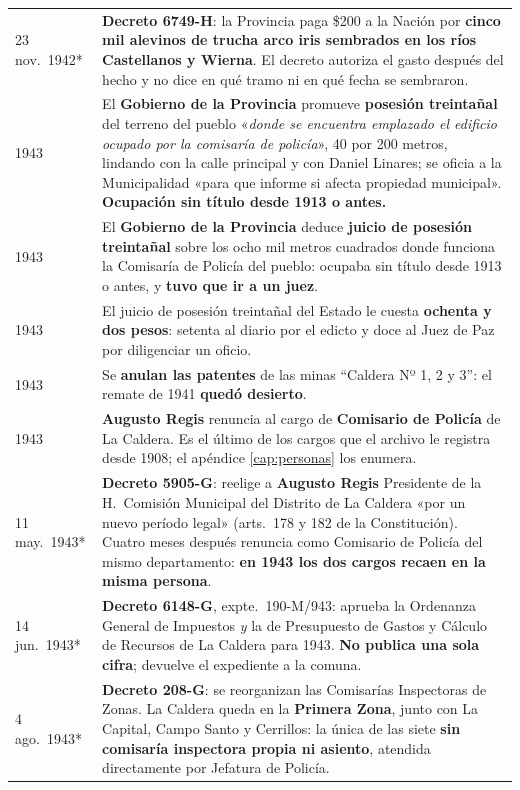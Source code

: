 \begin{longtable}{@{}p{2.7cm}p{10.3cm}@{}}
23 nov.\ 1942* & \textbf{Decreto 6749-H}: la Provincia paga \$200 a la Nación por \textbf{cinco mil alevinos de trucha arco iris sembrados en los ríos Castellanos y Wierna}. El decreto autoriza el gasto después del hecho y no dice en qué tramo ni en qué fecha se sembraron. \\
1943 & El \textbf{Gobierno de la Provincia} promueve \textbf{posesión treintañal} del terreno del pueblo «\textit{donde se encuentra emplazado el edificio ocupado por la comisaría de policía}», 40 por 200 metros, lindando con la calle principal y con Daniel Linares\index{Linares, Daniel}; se oficia a la Municipalidad «para que informe si afecta propiedad municipal». \textbf{Ocupación sin título desde 1913 o antes.} \\
1943 & El \textbf{Gobierno de la Provincia} deduce \textbf{juicio de posesión treintañal} sobre los ocho mil metros cuadrados donde funciona la Comisaría de Policía del pueblo: ocupaba sin título desde 1913 o antes, y \textbf{tuvo que ir a un juez}. \\
1943 & El juicio de posesión treintañal del Estado le cuesta \textbf{ochenta y dos pesos}: setenta al diario por el edicto y doce al Juez de Paz por diligenciar un oficio. \\
1943 & Se \textbf{anulan las patentes} de las minas ``Caldera Nº 1, 2 y 3'': el remate de 1941 \textbf{quedó desierto}. \\
1943 & \textbf{Augusto Regis\index{Regis, Augusto}} renuncia al cargo de \textbf{Comisario de Policía} de La Caldera. Es el último de los cargos que el archivo le registra desde 1908; el apéndice \ref{cap:personas} los enumera. \\
11 may.\ 1943* & \textbf{Decreto 5905-G}: reelige a \textbf{Augusto Regis\index{Regis, Augusto}} Presidente de la H.\ Comisión Municipal del Distrito de La Caldera «por un nuevo período legal» (arts.\ 178 y 182 de la Constitución). Cuatro meses después renuncia como Comisario de Policía del mismo departamento: \textbf{en 1943 los dos cargos recaen en la misma persona}. \\
14 jun.\ 1943* & \textbf{Decreto 6148-G}, expte.\ 190-M/943: aprueba la Ordenanza General de Impuestos \textit{y} la de Presupuesto de Gastos y Cálculo de Recursos de La Caldera para 1943. \textbf{No publica una sola cifra}; devuelve el expediente a la comuna. \\
4 ago.\ 1943* & \textbf{Decreto 208-G}: se reorganizan las Comisarías Inspectoras de Zonas. La Caldera queda en la \textbf{Primera Zona}, junto con La Capital, Campo Santo y Cerrillos: la única de las siete \textbf{sin comisaría inspectora propia ni asiento}, atendida directamente por Jefatura de Policía. \\

\end{longtable}
